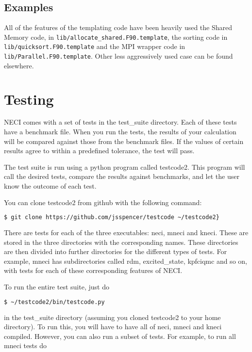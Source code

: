 \documentclass[a4paper,notitlepage]{scrreprt}
\let\code\lstinline
\begin{document}
{{{\subsection{Examples}
	All of the features of the templating code have been heavily used the
	Shared Memory code, in \code{lib/allocate_shared.F90.template},
	the sorting code in \code{lib/quicksort.F90.template} and the
	MPI wrapper code in \code{lib/Parallel.F90.template}. Other less
	aggressively used case can be found elsewhere.

\section{Testing}
NECI comes with a set of tests in the test\_suite directory. Each of these
tests have a benchmark file. When you run the tests, the results of your
calculation will be compared against those from the benchmark files. If the
values of certain results agree to within a predefined tolerance, the test
will pass.

The test suite is run using a python program called testcode2. This program
will call the desired tests, compare the results against benchmarks, and let
the user know the outcome of each test.

You can clone testcode2 from github with the following command:

\begin{lstlisting}[language=bash]
    $ git clone https://github.com/jsspencer/testcode ~/testcode2}
\end{lstlisting}

There are tests for each of the three executables: neci, mneci and kneci.
These are stored in the three directories with the corresponding names.
These directories are then divided into further directories for the
different types of tests. For example, mneci has subdirectories called
rdm, excited\_state, kpfciqmc and so on, with tests for each of these
corresponding features of NECI.

To run the entire test suite, just do

\begin{lstlisting}[language=bash]
    $ ~/testcode2/bin/testcode.py
\end{lstlisting}

in the test\_suite directory (assuming you cloned testcode2 to your home
directory). To run this, you will have to have all of neci, mneci and
kneci compiled.  However, you can also run a subset of tests. For example,
to run all mneci tests do

}}}
\end{document}
